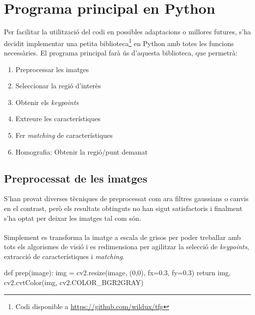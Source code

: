 \label{sec:Implementacio}

\section{Programa principal en Python}
	Per facilitar la utilització del codi en possibles adaptacions o millores futures, s'ha decidit implementar una petita biblioteca\footnote{Codi disponible a \url{https://github.com/wildux/tfg}}
	en Python amb totes les funcions necessàries. El programa principal farà ús d'aquesta biblioteca, que permetrà:

	\begin{enumerate}
		\item{Preprocessar les imatges}
		\item{Seleccionar la regió d'interès}
		\item{Obtenir els \textit{keypoints}}
		\item{Extreure les característiques}
		\item{Fer \textit{matching} de característiques}
		\item{Homografia: Obtenir la regió/punt demanat}
	\end{enumerate}

	\subsection{Preprocessat de les imatges}
		S'han provat diverses tècniques de preprocessat com ara filtres gaussians o canvis en el contrast, però els resultats obtinguts no han sigut satisfactoris i finalment s'ha optat per deixar
		les imatges tal com són.\\\\
		Simplement es transforma la imatge a escala de grisos per poder treballar amb tots els algorismes de visió i es redimensiona per agilitzar la selecció de \textit{keypoints}, extracció
		de característiques i \textit{matching}.\\
		\begin{python}
def prep(image):
	img = cv2.resize(image, (0,0), fx=0.3, fy=0.3)
	return img, cv2.cvtColor(img, cv2.COLOR_BGR2GRAY)
		\end{python}
